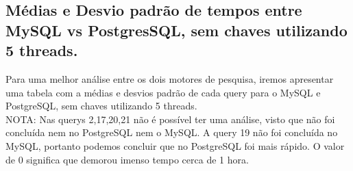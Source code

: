 \documentclass{article}
\begin{document}
  \clearpage

  \subsection{Médias e Desvio padrão de tempos entre MySQL vs PostgresSQL, sem chaves utilizando 5 threads.}

  \texttt{}\par Para uma melhor análise entre os dois motores de pesquisa, iremos apresentar uma tabela com a médias e desvios padrão de cada query para o MySQL e PostgreSQL, sem chaves utilizando 5 threads. \\
NOTA: Nas querys 2,17,20,21 não é possível ter uma análise, visto que não foi concluída nem no PostgreSQL nem o MySQL. A query 19 não foi concluída no MySQL, portanto podemos concluir que no PostgreSQL foi mais rápido. O valor de 0 significa que demorou imenso tempo cerca de 1 hora.
\end{document}
